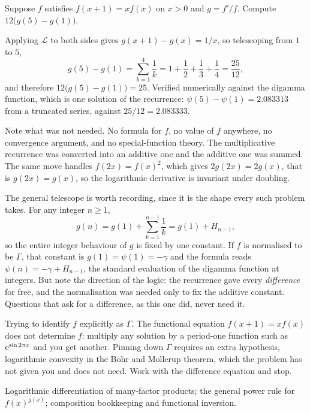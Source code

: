 \begin{worked}
Suppose $f$ satisfies $f(x+1)=x f(x)$ on $x>0$ and $g=f'/f$. Compute $12\bigl(g(5)-g(1)\bigr)$.

Applying $\mathcal{L}$ to both sides gives $g(x+1)-g(x)=1/x$, so telescoping from $1$ to $5$,
\[
g(5)-g(1)=\sum_{k=1}^{4}\frac1k=1+\frac12+\frac13+\frac14=\frac{25}{12},
\]
and therefore $12\bigl(g(5)-g(1)\bigr)=25$. Verified numerically against the digamma function, which is one solution of the recurrence: $\psi(5)-\psi(1)=2.083313$ from a truncated series, against $25/12=2.083333$.

Note what was not needed. No formula for $f$, no value of $f$ anywhere, no convergence argument, and no special-function theory. The multiplicative recurrence was converted into an additive one and the additive one was summed. The same move handles $f(2x)=f(x)^{2}$, which gives $2g(2x)=2g(x)$, that is $g(2x)=g(x)$, so the logarithmic derivative is invariant under doubling.

The general telescope is worth recording, since it is the shape every such problem takes. For any integer $n\geq1$,
\[
g(n)=g(1)+\sum_{k=1}^{n-1}\frac1k=g(1)+H_{n-1},
\]
so the entire integer behaviour of $g$ is fixed by one constant. If $f$ is normalised to be $\Gamma$, that constant is $g(1)=\psi(1)=-\gamma$ and the formula reads $\psi(n)=-\gamma+H_{n-1}$, the standard evaluation of the digamma function at integers. But note the direction of the logic: the recurrence gave every \emph{difference} for free, and the normalisation was needed only to fix the additive constant. Questions that ask for a difference, as this one did, never need it.
\end{worked}

\begin{trap}
Trying to identify $f$ explicitly as $\Gamma$. The functional equation $f(x+1)=xf(x)$ does not determine $f$: multiply any solution by a period-one function such as $\mathrm{e}^{\sin 2\pi x}$ and you get another. Pinning down $\Gamma$ requires an extra hypothesis, logarithmic convexity in the Bohr and Mollerup theorem, which the problem has not given you and does not need. Work with the difference equation and stop.
\end{trap}

\begin{seealsob}Logarithmic differentiation of many-factor products; the general power rule for $f(x)^{g(x)}$; composition bookkeeping and functional inversion.\end{seealsob}

